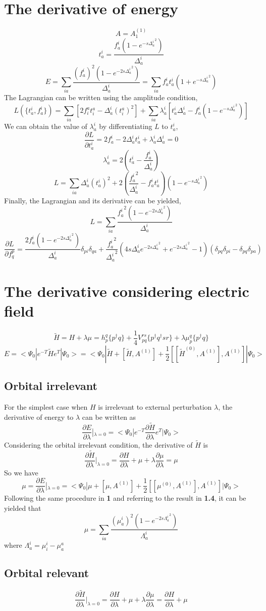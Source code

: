 \documentclass{article}
\begin{document}
\section{The derivative of energy}
$$A=A_1^{(1)}$$
$$t_a^i=\frac{f_a^i(1-e^{-s{\Delta^i_a}^2})}{{\Delta^i_a}}$$
$$E=\sum_{ia}\frac{(f_a^i)^2(1-e^{-2s{\Delta^i_a}^2})}{{\Delta^i_a}}=\sum_{ia}f^i_at^i_a(1+e^{-s{\Delta^i_a}^2})$$
\quad The Lagrangian can be written using the amplitude condition,
$$L(\{t^i_a,f^i_a\})=\sum_{ia}[2f^a_it^a_i-\Delta_a^i(t_i^a)^2]+\sum_{ia}\lambda^i_a[t^i_a{\Delta^i_a}-f^i_a(1-e^{-s{\Delta^i_a}^2})] $$
\quad We can obtain the value of $\lambda_a^i$ by differentiating $L$ to $t_a^i$,
$$\frac{\partial L}{\partial t^i_a}=2f^i_a-2\Delta^i_at^i_a+\lambda_a^i{\Delta^i_a}=0$$
$$\lambda^i_a=2(t_a^i-\frac{f^i_a}{\Delta_a^i})$$
$$L=\sum_{ia}\Delta_a^i(t^i_a)^2+2(\frac{{f^i_a}^2}{\Delta_a^i}-f^i_at^i_a)(1-e^{-s{\Delta^i_a}^2})$$
\quad Finally, the Lagrangian and its derivative can be yielded,
$$L=\sum_{ia}\frac{{f_a^i}^2(1-e^{-2s{\Delta^i_a}^2})}{{\Delta^i_a}}$$
$$\frac{\partial L}{\partial f^p_q}=\frac{2f_a^i(1-e^{-2s{\Delta^i_a}^2})}{{\Delta^i_a}}\delta_{pi}\delta_{qa}+\frac{{f^i_a}^2}{{\Delta^i_a}^2}(4s{\Delta^i_a} e^{-2s{\Delta^i_a}^2}+e^{-2s{\Delta^i_a}^2}-1)(\delta_{pq}\delta_{pi}-\delta_{pq}\delta_{pa})$$

\section{The derivative considering electric field}
$$\tilde{H}=H+\lambda\mu=h^q_p\{p^\dagger q\}+\frac{1}{4}V_{pq}^{rs}\{p^\dagger q^\dagger sr\}+\lambda\mu_p^q\{p^\dagger q\}$$
$$E=<\Psi_0|e^{-T}\tilde{H}e^T|\Psi_0>=<\Psi_0|\tilde{H}+[\tilde{H},A^{(1)}]+\frac{1}{2}[[{\tilde{H}}^{(0)},A^{(1)}],A^{(1)}]|\Psi_0>$$



\subsection{Orbital irrelevant}
\quad For the simplest case when $H$ is irrelevant to external perturbation $\lambda$, the derivative of energy to $\lambda$ can be written as
$$\frac{\partial E}{\partial \lambda}|_{\lambda=0}=<\Psi_0|e^{-T}\frac{\partial\tilde{H}}{\partial \lambda}e^T|\Psi_0>$$
\quad Considering the orbital irrelevant condition, the derivative of $\tilde{H}$ is
$$\frac{\partial \tilde{H}}{\partial \lambda}|_{\lambda=0}=\frac{\partial H}{\partial \lambda}+\mu+\lambda \frac{\partial \mu}{\partial \lambda}=\mu$$
\quad So we have
$$\mu=\frac{\partial E}{\partial \lambda}|_{\lambda=0}=<\Psi_0|\mu+[\mu,A^{(1)}]+\frac{1}{2}[[{\mu}^{(0)},A^{(1)}],A^{(1)}]|\Psi_0>$$
Following the same procedure in \textbf{1} and referring to the result in \textbf{1.4}, it can be yielded that
$$\mu=\sum_{ia}\frac{(\mu_a^i)^2(1-e^{-2s{\Lambda^i_a}^2})}{{\Lambda^i_a}}$$
\quad where $\Lambda_a^i=\mu^i_i-\mu_a^a$ 


\subsection{Orbital relevant}
$$\frac{\partial \tilde{H}}{\partial \lambda}|_{\lambda=0}=\frac{\partial H}{\partial \lambda}+\mu+\lambda \frac{\partial \mu}{\partial \lambda}=\frac{\partial H}{\partial \lambda}+\mu$$
\end{document}
